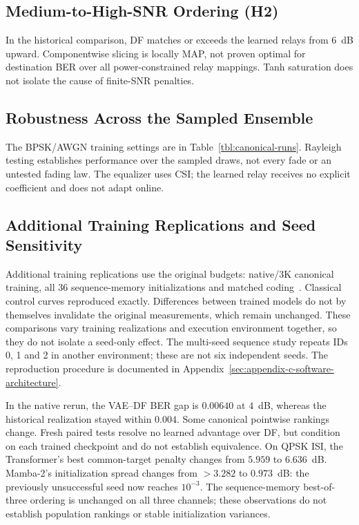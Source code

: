 \subsection{Medium-to-High-SNR Ordering (H2)}\label{sec:classical-dominance-at-high-snr-h2-confirmed}

In the historical comparison, DF matches or exceeds the learned relays from 6~dB upward. Componentwise slicing is locally MAP, not proven optimal for destination BER over all power-constrained relay mappings. Tanh saturation does not isolate the cause of finite-SNR penalties.

\subsection{Robustness Across the Sampled Ensemble}\label{sec:channel-robustness}

The BPSK/AWGN training settings are in Table~\ref{tbl:canonical-runs}. Rayleigh testing establishes performance over the sampled draws, not every fade or an untested fading law. The equalizer uses CSI; the learned relay receives no explicit coefficient and does not adapt online.

\subsection{Additional Training Replications and Seed Sensitivity}\label{sec:round2-rerun-validation}

Additional training replications use the original budgets: native/3K canonical training, all 36 sequence-memory initializations and matched coding~. Classical control curves reproduced exactly. Differences between trained models do not by themselves invalidate the original measurements, which remain unchanged. These comparisons vary training realizations and execution environment together, so they do not isolate a seed-only effect. The multi-seed sequence study repeats IDs 0, 1 and 2 in another environment; these are not six independent seeds. The reproduction procedure is documented in Appendix~\ref{sec:appendix-c-software-architecture}.

In the native rerun, the VAE--DF BER gap is $0.00640$ at $4$~dB, whereas the historical realization stayed within $0.004$. Some canonical pointwise rankings change. Fresh paired tests resolve no learned advantage over DF, but condition on each trained checkpoint and do not establish equivalence. On QPSK ISI, the Transformer's best common-target penalty changes from $5.959$ to $6.636$~dB. Mamba-2's initialization spread changes from $>3.282$ to $0.973$~dB: the previously unsuccessful seed now reaches $10^{-3}$. The sequence-memory best-of-three ordering is unchanged on all three channels; these observations do not establish population rankings or stable initialization variances.

